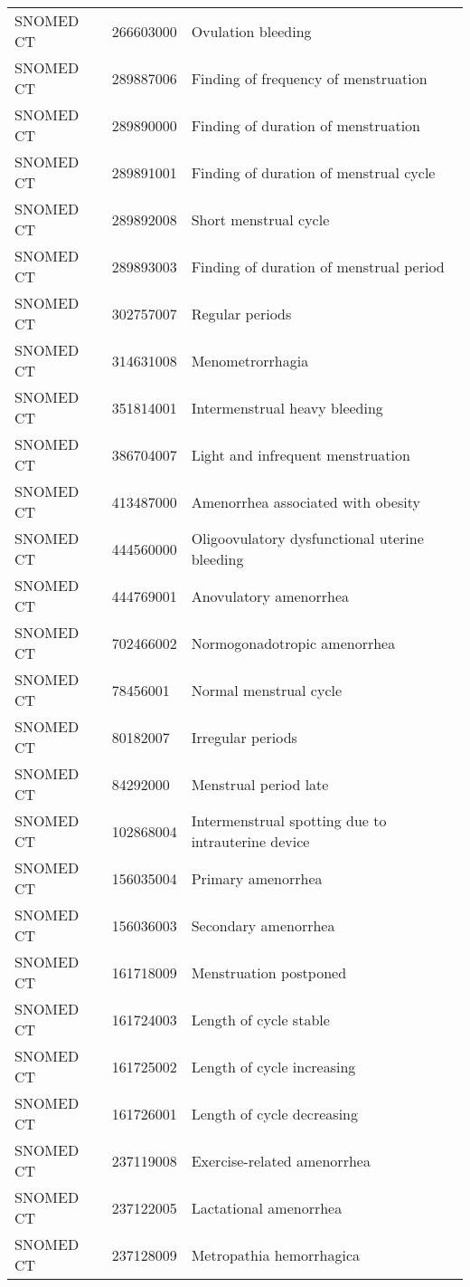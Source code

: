 \begin{longtable}{p{}p{}p{}}
  SNOMED CT & 266603000 & Ovulation bleeding \\ 
  SNOMED CT & 289887006 & Finding of frequency of menstruation \\ 
  SNOMED CT & 289890000 & Finding of duration of menstruation \\ 
  SNOMED CT & 289891001 & Finding of duration of menstrual cycle \\ 
  SNOMED CT & 289892008 & Short menstrual cycle \\ 
  SNOMED CT & 289893003 & Finding of duration of menstrual period \\ 
  SNOMED CT & 302757007 & Regular periods \\ 
  SNOMED CT & 314631008 & Menometrorrhagia \\ 
  SNOMED CT & 351814001 & Intermenstrual heavy bleeding \\ 
  SNOMED CT & 386704007 & Light and infrequent menstruation \\ 
  SNOMED CT & 413487000 & Amenorrhea associated with obesity \\ 
  SNOMED CT & 444560000 & Oligoovulatory dysfunctional uterine bleeding \\ 
  SNOMED CT & 444769001 & Anovulatory amenorrhea \\ 
  SNOMED CT & 702466002 & Normogonadotropic amenorrhea \\ 
  SNOMED CT & 78456001 & Normal menstrual cycle \\ 
  SNOMED CT & 80182007 & Irregular periods \\ 
  SNOMED CT & 84292000 & Menstrual period late \\ 
  SNOMED CT & 102868004 & Intermenstrual spotting due to intrauterine device \\ 
  SNOMED CT & 156035004 & Primary amenorrhea \\ 
  SNOMED CT & 156036003 & Secondary amenorrhea \\ 
  SNOMED CT & 161718009 & Menstruation postponed \\ 
  SNOMED CT & 161724003 & Length of cycle stable \\ 
  SNOMED CT & 161725002 & Length of cycle increasing \\ 
  SNOMED CT & 161726001 & Length of cycle decreasing \\ 
  SNOMED CT & 237119008 & Exercise-related amenorrhea \\ 
  SNOMED CT & 237122005 & Lactational amenorrhea \\ 
  SNOMED CT & 237128009 & Metropathia hemorrhagica \\ 

\end{longtable}
